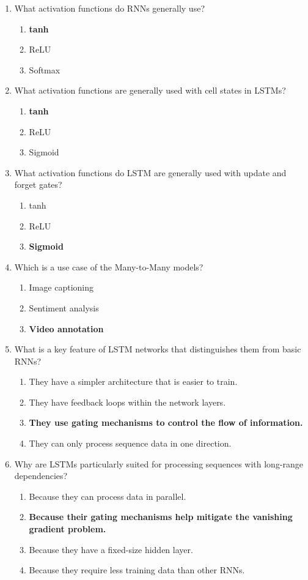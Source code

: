 \documentclass{report}
\numberwithin{equation}{section}
\begin{document}
\begin{enumerate}
    \item What activation functions do RNNs generally use?
    \begin{enumerate}[label=\alph*.]
        \item \textbf{tanh}
        \item ReLU
        \item Softmax
    \end{enumerate}
    \item What activation functions are generally used with cell states in LSTMs?
    \begin{enumerate}[label=\alph*.]
        \item \textbf{tanh}
        \item ReLU
        \item Sigmoid
    \end{enumerate}
    \item What activation functions do LSTM are generally used with update and forget gates?
    \begin{enumerate}[label=\alph*.]
        \item tanh
        \item ReLU
        \item \textbf{Sigmoid}
    \end{enumerate}
    \item Which is a use case of the Many-to-Many models?
    \begin{enumerate}[label=\alph*.]
        \item Image captioning
        \item Sentiment analysis
        \item \textbf{Video annotation}
    \end{enumerate}
\item What is a key feature of LSTM networks that distinguishes them from basic RNNs?
\begin{enumerate}[label=\alph*.]
    \item They have a simpler architecture that is easier to train.
    \item They have feedback loops within the network layers.
    \item \textbf{They use gating mechanisms to control the flow of information.}
    \item They can only process sequence data in one direction.
\end{enumerate}

\item Why are LSTMs particularly suited for processing sequences with long-range dependencies?
\begin{enumerate}[label=\alph*.]
    \item Because they can process data in parallel.
    \item \textbf{Because their gating mechanisms help mitigate the vanishing gradient problem.}
    \item Because they have a fixed-size hidden layer.
    \item Because they require less training data than other RNNs.
\end{enumerate}


\end{enumerate}
\end{document}
